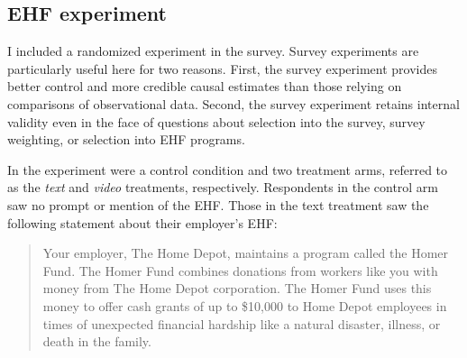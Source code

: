 \documentclass[
  11pt,
  oneside]{article}
\begin{document}
\subsection{EHF experiment}\label{ehf-experiment}

I included a randomized experiment in the survey. Survey experiments are particularly useful here for two reasons. First, the survey experiment provides better control and more credible causal estimates than those relying on comparisons of observational data. Second, the survey experiment retains internal validity even in the face of questions about selection into the survey, survey weighting, or selection into EHF programs.

In the experiment were a control condition and two treatment arms, referred to as the \emph{text} and \emph{video} treatments, respectively. Respondents in the control arm saw no prompt or mention of the EHF. Those in the text treatment saw the following statement about their employer's EHF:

\begin{quote}
Your employer, The Home Depot, maintains a program called the Homer Fund. The Homer Fund combines donations from workers like you with money from The Home Depot corporation. The Homer Fund uses this money to offer cash grants of up to \$10,000 to Home Depot employees in times of unexpected financial hardship like a natural disaster, illness, or death in the family.
\end{quote}
\end{document}
